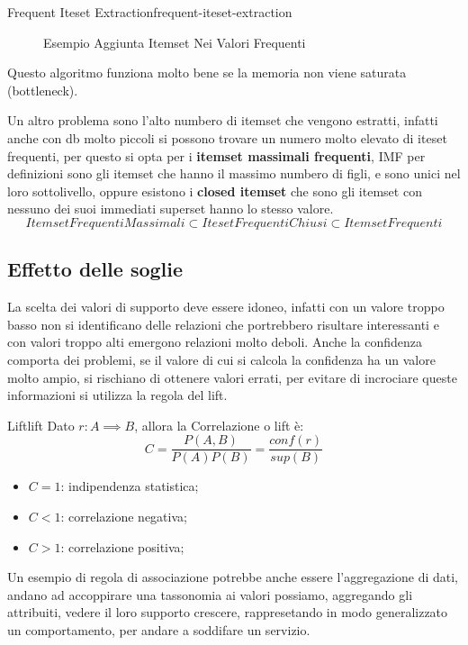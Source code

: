 \documentclass[12pt]{article}
\begin{document}
\begin{definition}{Frequent Iteset Extraction}{frequent-iteset-extraction}
\begin{enumerate}
\begin{figure}[H]
            \caption{Esempio Aggiunta Itemset Nei Valori Frequenti}
            \label{fig:esempio-aggiunta-itemset-nei-valori-frequenti}
        \end{figure}
\end{enumerate}
\end{definition}
Questo algoritmo funziona molto bene se la memoria non viene saturata (bottleneck).

Un altro problema sono l'alto numbero di itemset che vengono estratti, infatti anche con db molto piccoli si possono trovare un numero molto elevato di iteset frequenti, per questo si opta per i \textbf{itemset massimali frequenti}, IMF per definizioni sono gli itemset che hanno il massimo numbero di figli, e sono unici nel loro sottolivello, oppure esistono i \textbf{closed itemset} che sono gli itemset con nessuno dei suoi immediati superset hanno lo stesso valore.
\[ \boxed{ItemsetFrequentiMassimali \subset ItesetFrequentiChiusi \subset ItemsetFrequenti} \]

\subsection{Effetto delle soglie}
La scelta dei valori di supporto deve essere idoneo, infatti con un valore troppo basso non si identificano delle relazioni che portrebbero risultare interessanti e con valori troppo alti emergono relazioni molto deboli. Anche la confidenza comporta dei problemi, se il valore di cui si calcola la confidenza ha un valore molto ampio, si rischiano di ottenere valori errati, per evitare di incrociare queste informazioni si utilizza la regola del lift.
\begin{definition}{Lift}{lift}
    Dato $ r: A \implies B $, allora la Correlazione o lift \`e:
    \[ C = \frac{P(A,B)}{P(A)P(B)} = \frac{conf(r)}{sup(B)} \]
    \begin{itemize}
        \item $C = 1$: indipendenza statistica;
        \item $C < 1$: correlazione negativa;
        \item $C > 1$: correlazione positiva;
    \end{itemize}
\end{definition}


Un esempio di regola di associazione potrebbe anche essere l'aggregazione di dati, andano ad accoppirare una tassonomia ai valori possiamo, aggregando gli attribuiti, vedere il loro supporto crescere, rappresetando in modo generalizzato un comportamento, per andare a soddifare un servizio.
\end{document}
